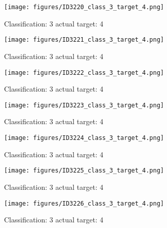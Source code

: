 \begin{figure}[h!]
\begin{center}
\texttt{[image: figures/ID3220\_class\_3\_target\_4.png]}
\end{center}
\caption{ Classification: 3 actual target: 4}
\label{fig:ID3220_class_3_target_4}
\end{figure}
\begin{figure}[h!]
\begin{center}
\texttt{[image: figures/ID3221\_class\_3\_target\_4.png]}
\end{center}
\caption{ Classification: 3 actual target: 4}
\label{fig:ID3221_class_3_target_4}
\end{figure}
\begin{figure}[h!]
\begin{center}
\texttt{[image: figures/ID3222\_class\_3\_target\_4.png]}
\end{center}
\caption{ Classification: 3 actual target: 4}
\label{fig:ID3222_class_3_target_4}
\end{figure}
\begin{figure}[h!]
\begin{center}
\texttt{[image: figures/ID3223\_class\_3\_target\_4.png]}
\end{center}
\caption{ Classification: 3 actual target: 4}
\label{fig:ID3223_class_3_target_4}
\end{figure}
\begin{figure}[h!]
\begin{center}
\texttt{[image: figures/ID3224\_class\_3\_target\_4.png]}
\end{center}
\caption{ Classification: 3 actual target: 4}
\label{fig:ID3224_class_3_target_4}
\end{figure}
\begin{figure}[h!]
\begin{center}
\texttt{[image: figures/ID3225\_class\_3\_target\_4.png]}
\end{center}
\caption{ Classification: 3 actual target: 4}
\label{fig:ID3225_class_3_target_4}
\end{figure}
\begin{figure}[h!]
\begin{center}
\texttt{[image: figures/ID3226\_class\_3\_target\_4.png]}
\end{center}
\caption{ Classification: 3 actual target: 4}
\label{fig:ID3226_class_3_target_4}
\end{figure}
